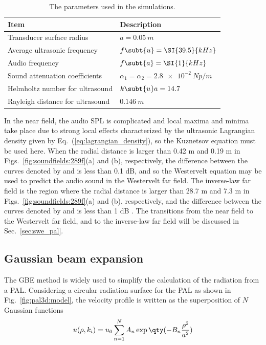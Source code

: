 \begin{table}
    \centering
    \begin{tabular}{ll}
        \toprule
        Item & Description \\
        \midrule
        Transducer surface radius & $a = \SI{0.05}{m}$\\
        Average ultrasonic frequency & $f\subt{u} = \SI{39.5}{kHz}$\\
        Audio frequency & $f\subt{a} = \SI{1}{kHz}$\\
        Sound attenuation coefficients & $\alpha_1=\alpha_2 = \SI{2.8e-2}{Np/m}$\\
        Helmholtz number for ultrasound & $k\subt{u} a  = 14.7$\\
        Rayleigh distance for ultrasound & $\SI{0.146}{m}$\\
        \bottomrule
    \end{tabular}
    \caption{The parameters used in the simulations.}
    \label{tab:param:f98fjs}
\end{table}

In the near field, the audio SPL is complicated and local maxima and minima take place due to strong local effects characterized by the ultrasonic Lagrangian density given by Eq.~(\ref{eq:lagrangian_density}), so the Kuznetsov equation must be used here. 
When the radial distance is larger than 0.42 m and 0.19 m in Figs.~\ref{fig:soundfields:289f}(a) and (b), respectively, 
the difference between the curves denoted by  and  is less than 0.1 dB, 
and so the Westervelt equation may be used to predict the audio sound in the Westervelt far field. 
The inverse-law far field is the region where the radial distance is larger than 28.7 m and 7.3 m in Figs.~\ref{fig:soundfields:289f}(a) and (b), respectively, 
and the difference between the curves denoted by  and  is less than 1 dB
. 
The transitions from the near field to the Westervelt far field, and to the inverse-law far field will be discussed in Sec.~\ref{sec:swe_pal}.


\subsection{Gaussian beam expansion}
\label{sec:predict_gbe}
The GBE method is widely used to simplify the calculation of the radiation from a PAL.
Considering a circular radiation surface for the PAL as shown in Fig.~\ref{fig:pal3d:model}, the velocity profile is written as the superposition of $N$ Gaussian functions
\begin{equation}
    u(\rho, k_i) = 
    u_0
    \sum_{n=1}^N A_n \exp\qty(-B_n \frac{\rho^2}{a^2})
\end{equation}

